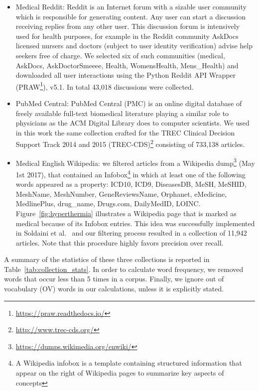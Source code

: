 \begin{itemize}
\item Medical Reddit: Reddit is an Internet forum with a sizable user community which is responsible for generating content. Any user can start a discussion receiving replies from any other user.
This discussion forum is intensively used for health purposes, for example in the Reddit community AskDocs licensed nursers and doctors (subject to user identity verification) advise help seekers free of charge. We selected six of such communities (medical, AskDocs, AskDoctorSmeeee, Health, WomensHealth, Mens\_Health) and downloaded all user interactions using the Python Reddit API Wrapper (PRAW\footnote{\url{https://praw.readthedocs.io/}}), v5.1. In total 43,018 discussions were collected.

\item PubMed Central: PubMed Central (PMC) is an online digital database of freely available full-text biomedical literature playing a similar role to physicians as the ACM Digital Library does to computer scientists. We used in this work the same collection crafted for the TREC Clinical Decision Support Track 2014 and 2015 (TREC-CDS)\footnote{\url{http://www.trec-cds.org/}} consisting of 733,138 articles. 
 
\item Medical English Wikipedia: we filtered articles from a Wikipedia dump\footnote{\url{https://dumps.wikimedia.org/enwiki/}} (May 1st 2017), that contained an Infobox\footnote{A Wikipedia infobox is a template containing structured information that appear on the right of Wikipedia pages to summarize key aspects of concepts} in which at least one of the following words appeared as a property: ICD10, ICD9, DiseasesDB, MeSH, MeSHID, MeshName, MeshNumber, GeneReviewsName, Orphanet, eMedicine, MedlinePlus, drug\_name, Drugs.com, DailyMedID, LOINC.
Figure~\ref{fig:hyperthermia} illustrates a Wikipedia page that is marked as medical because of its Infobox entries.
This idea was successfully implemented in Soldaini et al.~\cite{soldaini15} and our filtering process resulted in a collection of 11,942 articles. 
Note that this procedure highly favors precision over recall.
\end{itemize}

A summary of the statistics of these three collections is reported in Table~\ref{tab:collection_stats}.
In order to calculate word frequency, we removed words that occur less than 5 times in a corpus.
Finally, we ignore out of vocabulary (OV) words in our calculations, unless it is explicitly stated.

